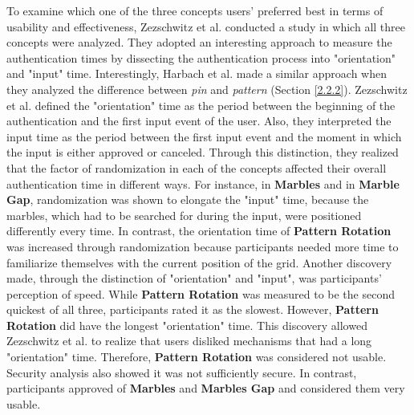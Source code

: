 To examine which one of the three concepts users' preferred best in terms of usability and effectiveness, Zezschwitz et al. \cite{Marbles} conducted a study in which all three concepts were analyzed. They adopted an interesting approach to measure the authentication times by dissecting the authentication process into "orientation" and "input" time. Interestingly, Harbach et al. \cite{AnatomySmartphone} made a similar approach when they analyzed the difference between \textit{pin} and \textit{pattern} (Section \ref{2.2.2}). Zezschwitz et al. \cite{Marbles} defined the "orientation" time as the period between the beginning of the authentication and the first input event of the user. Also, they interpreted the input time as the period between the first input event and the moment in which the input is either approved or canceled. Through this distinction, they realized that the factor of randomization in each of the concepts affected their overall authentication time in different ways. For instance, in \textbf{Marbles} and in \textbf{Marble Gap}, randomization was shown to elongate the "input" time, because the marbles, which had to be searched for during the input, were positioned differently every time. In contrast, the orientation time of \textbf{Pattern Rotation} was increased through randomization because participants needed more time to familiarize themselves with the current position of the grid. Another discovery made, through the distinction of "orientation" and "input", was participants' perception of speed. While \textbf{Pattern Rotation} was measured to be the second quickest of all three, participants rated it as the slowest. However, \textbf{Pattern Rotation} did have the longest "orientation" time. This discovery allowed Zezschwitz et al. \cite{Marbles} to realize that users disliked mechanisms that had a long "orientation" time. Therefore, \textbf{Pattern Rotation} was considered not usable. Security analysis also showed it was not sufficiently secure. In contrast, participants approved of \textbf{Marbles} and \textbf{Marbles Gap} and considered them very usable.\\


